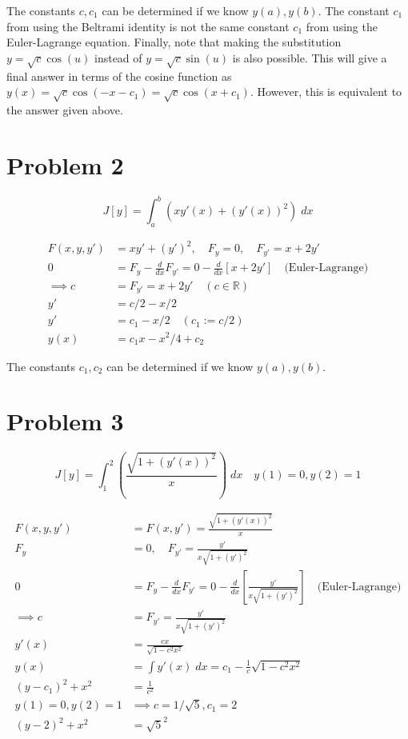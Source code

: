 \documentclass[a4paper]{article}
\begin{document}
The constants $c,c_1$ can be determined if we know $y(a),y(b)$.  The constant $c_1$ from using the Beltrami identity is not the same constant $c_1$ from using the Euler-Lagrange equation. Finally, note that making the substitution $y = \sqrt{c}\cos(u)$ instead of $y = \sqrt{c}\sin(u)$ is also possible. This will give a final answer in terms of the cosine function as $y(x) = \sqrt{c}\cos(-x-c_1) = \sqrt{c}\cos(x+c_1)$. However, this is equivalent to the answer given above. 

\section*{Problem 2}

$$J[y] = \int_a^b \left(xy'(x) + (y'(x))^2 \right) \; dx $$


\begin{align*}
F(x,y,y') &= xy' + (y')^2,  \quad F_y =0, \quad F_{y'} = x + 2y' \\
0 &= F_y - \frac{d}{dx}F_{y'} = 0 -\frac{d}{dx}\left[x+2y'\right] \quad \text{(Euler-Lagrange)}\\
\implies c &= F_{y'} = x + 2y' \quad (c \in \mathbb{R})\\
y' &= c/2 - x/2 \\
y' &= c_1 - x/2 \quad (c_1 := c/2)\\
y(x) &= c_1x - x^2/4 + c_2
\end{align*}

The constants $c_1,c_2$ can be determined if we know $y(a),y(b)$. 

\section*{Problem 3}

$$J[y] = \int_1^2 \left(\frac{\sqrt{1+(y'(x))^2}}{x}\right) \; dx  \quad y(1) = 0, y(2) = 1$$

\begin{align*}
F(x,y,y') &= F(x,y') = \frac{\sqrt{1+(y'(x))^2}}{x}\\
F_y &= 0, \quad F_{y'} = \frac{y'}{x\sqrt{1+(y')^2}}\\
0 &= F_y - \frac{d}{dx} F_{y'} = 0 -\frac{d}{dx}\left[ \frac{y'}{x\sqrt{1+(y')^2}}\right] \quad \text{(Euler-Lagrange)} \\
\implies c &= F_{y'} = \frac{y'}{x\sqrt{1+(y')^2}} \\
y'(x) &= \frac{cx}{\sqrt{1-c^2x^2}} \\
y(x) &=\int y'(x) \; dx = c_1 - \frac{1}{c}\sqrt{1-c^2x^2} \\
(y-c_1)^2 + x^2 &= \frac{1}{c^2} \\
y(1) = 0, y(2) = 1 &\implies c = 1/\sqrt{5}, c_1 = 2 \\
(y-2)^2 + x^2 &= \sqrt{5}^2
\end{align*}
\end{document}
